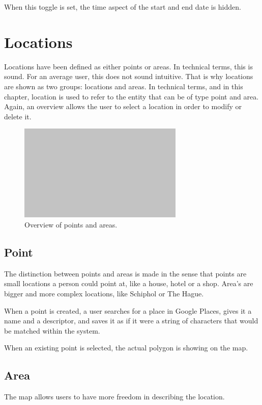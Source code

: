 When this toggle is set, the time aspect of the start and end date is hidden.

%
\section{Locations}
Locations have been defined as either points or areas. In technical terms, this is sound. For an average user, this does not sound intuitive. That is why locations are shown as two groups: locations and areas. In technical terms, and in this chapter, location is used to refer to the entity that can be of type point and area. Again, an overview allows the user to select a location in order to modify or delete it.

\begin{figure}[H]
	\centering
	\includegraphics[width=0.7\textwidth]{Blank}
	\caption[Locations Overview]{Overview of points and areas.}
	\label{fig:Locations Overview}
\end{figure}

\subsection{Point}
The distinction between points and areas is made in the sense that points are small locations a person could point at, like a house, hotel or a shop. Area's are bigger and more complex locations, like Schiphol or The Hague.

When a point is created, a user searches for a place in Google Places, gives it a name and a descriptor, and saves it as if it were a string of characters that would be matched within the system.

When an existing point is selected, the actual polygon is showing on the map.

\subsection{Area}
The map allows users to have more freedom in describing the location.

